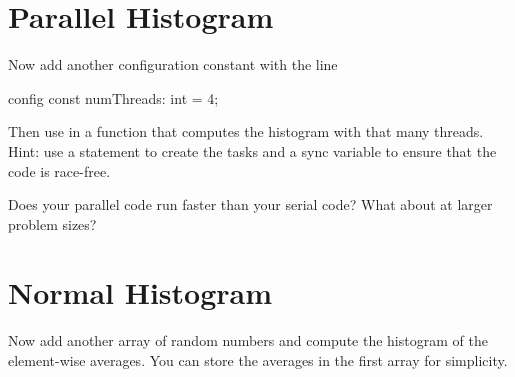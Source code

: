 \documentclass[10pt]{article}
\begin{document}
\section{Parallel Histogram}
Now add another configuration constant with the line
\begin{chapel}
config const numThreads: int = 4;
\end{chapel}
Then use  in a function that computes the histogram
with that many threads.  Hint: use a  statement to
create the tasks and a sync variable to ensure that the code is
race-free.

Does your parallel code run faster than your serial code?  What about
at larger problem sizes?

\section{Normal Histogram}
Now add another array of random numbers and compute the histogram of
the element-wise averages.  You can store the averages in the first
array for simplicity.
\end{document}

